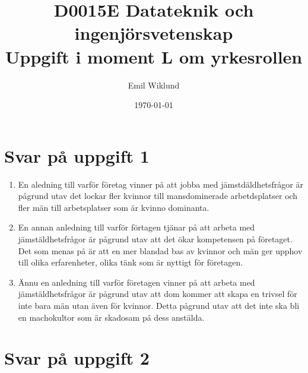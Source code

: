 \documentclass[a4paper,12pt]{article}
\title{D0015E Datateknik och ingenjörsvetenskap \\
       Uppgift i moment L om yrkesrollen}
\author{Emil Wiklund}
\date{\today}
\begin{document}
\maketitle




\section*{Svar på uppgift 1}



\begin{enumerate}
  \item En aledning till varför företag vinner på att jobba med 
  jämstdäldhetsfrågor är pågrund utav det lockar fler kvinnor 
  till mansdominerade arbetdsplatser och fler män till arbetsplatser
  som är kvinno dominanta. 
  \item En annan anledning till varför förtagen tjänar på att 
  arbeta med jämstäldhetsfrågor är pågrund utav att det ökar
  kompetensen på företaget. Det som menas på är att en mer blandad
  bas av kvinnor och män ger upphov till olika erfarenheter, olika tänk
  som är nyttigt för företagen. 
  \item Ännu en anledning till varför företagen vinner på att arbeta med
  jämstäldhetsfrågor är pågrund utav att dom kommer att skapa en trivsel 
  för inte bara män utan även för kvinnor. Detta pågrund utav att det inte 
  ska bli en machokultor som är skadosam på dess anstälda. 
\end{enumerate}


\section*{Svar på uppgift 2}


\end{document}
